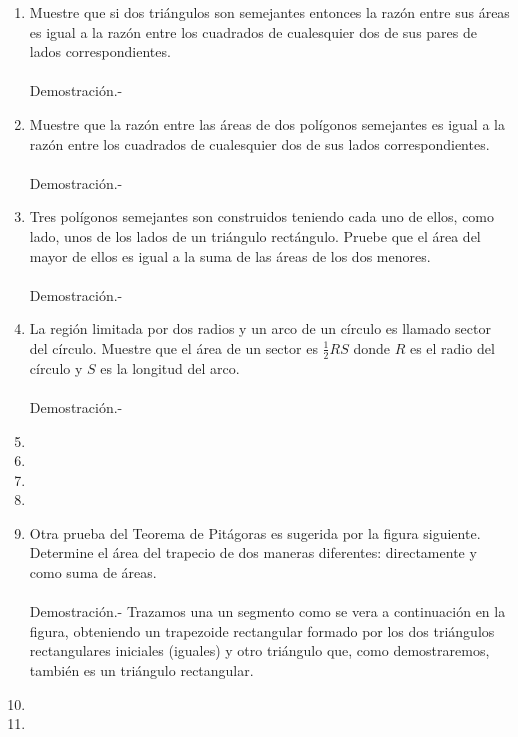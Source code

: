 \documentclass[10pt]{article}
\begin{document}
\begin{enumerate}
\item  Muestre que si dos triángulos son semejantes entonces la razón entre sus áreas es igual a la razón entre los cuadrados de cualesquier dos de sus pares de lados correspondientes.\\\\
    Demostración.-\;

\item Muestre que la razón entre las áreas de dos polígonos semejantes es igual a la razón entre los cuadrados de cualesquier dos de sus lados correspondientes.\\\\
    Demostración.-\;

\item Tres polígonos semejantes son construidos teniendo cada uno de ellos, como lado, unos de los lados de un triángulo rectángulo. Pruebe que el área del mayor de ellos es igual a la suma de las áreas de los dos menores.\\\\
    Demostración.-\;

\item La región limitada por dos radios y un arco de un círculo es llamado sector del círculo. Muestre que el área de un sector es $\frac{1}{2}RS$ donde $R$ es el radio del círculo y $S$ es la longitud del arco.\\\\
    Demostración.-\;

\item 

\item 

\item 

\item 

\item Otra prueba del Teorema de Pitágoras es sugerida por la figura siguiente. Determine el área del trapecio de dos maneras diferentes: directamente y como suma de áreas.\\\\
    Demostración.-\; Trazamos una un segmento como se vera a continuación en  la figura, obteniendo un trapezoide rectangular formado por los dos triángulos rectangulares iniciales (iguales) y otro triángulo que, como demostraremos, también es un triángulo rectangular.

\item 

\item 

\end{enumerate}
\end{document}
